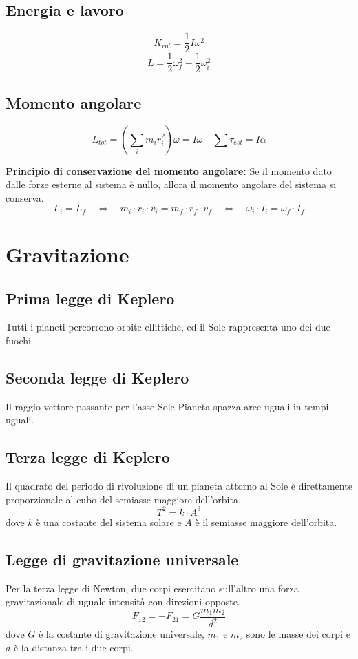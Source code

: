 \documentclass[a4paper]{article}
\theoremstyle{break}
\theoremstyle{break}
\theoremstyle{break}
\theoremstyle{break}
\begin{document}
\subsection{Energia e lavoro}
\[
  K_{rot} = \frac{1}{2} I \omega^2
\] 
\[
  L = \frac{1}{2} \omega_f^2 - \frac{1}{2} \omega_i^2
\] 

\subsection{Momento angolare}
\[
  L_{tot} = \left( \sum_i m_i r_i^2 \right) \omega = I \omega \quad \sum \tau_{est} = I \alpha
\] 

\textbf{Principio di conservazione del momento angolare:}
\noindent Se il momento dato dalle forze esterne al sistema è nullo, allora il momento angolare del sistema si
conserva.
\[
L_i = L_f \quad \iff \quad m_i \cdot r_i \cdot v_i = m_f \cdot r_f \cdot v_f \quad \iff \quad \omega_i \cdot I_i = \omega_f \cdot I_f
\] 

\section{Gravitazione}
\subsection{Prima legge di Keplero}
Tutti i pianeti percorrono orbite ellittiche, ed il Sole rappresenta uno dei due fuochi

\subsection{Seconda legge di Keplero}
Il raggio vettore passante per l’asse Sole-Pianeta spazza aree uguali in tempi uguali.

\subsection{Terza legge di Keplero}
Il quadrato del periodo di rivoluzione di un pianeta attorno al Sole è direttamente proporzionale al
cubo del semiasse maggiore dell’orbita.
\[
T^2 = k \cdot A^3
\] 
dove \( k \) è una costante del sistema solare e \( A \) è il semiasse maggiore dell’orbita.

\subsection{Legge di gravitazione universale}
Per la terza legge di Newton, due corpi esercitano sull’altro una forza
gravitazionale di uguale intensità con direzioni opposte.
\[
  F_{12} = -F_{21} = G \frac{m_1 m_2}{d^2}
\] 
dove \( G \) è la costante di gravitazione universale, \( m_1 \) e \( m_2 \) sono le masse dei corpi e \( d \) è la distanza tra i due corpi.
\end{document}
